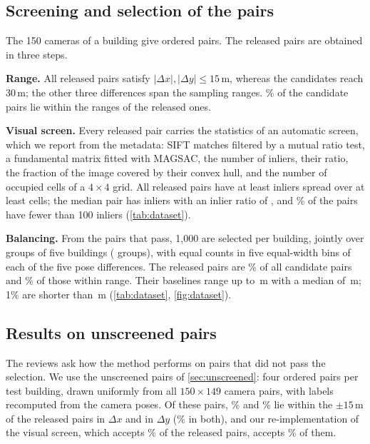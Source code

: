 \subsection{Screening and selection of the pairs}

The 150 cameras of a building give \dsCand{} ordered pairs. The released pairs are obtained in three steps.

\noindent\textbf{Range.} All released pairs satisfy $|\Delta x|,|\Delta y|\le15$\,m, whereas the candidates reach 30\,m; the other three differences span the sampling ranges. \dsInRange\% of the candidate pairs lie within the ranges of the released ones.

\noindent\textbf{Visual screen.} Every released pair carries the statistics of an automatic screen, which we report from the metadata: SIFT matches filtered by a mutual ratio test, a fundamental matrix fitted with MAGSAC, the number of inliers, their ratio, the fraction of the image covered by their convex hull, and the number of occupied cells of a $4{\times}4$ grid. All released pairs have at least \dsMinInl{} inliers spread over at least \dsMinCells{} cells; the median pair has \dsInlMed{} inliers with an inlier ratio of \dsInlRatioMed, and \dsInlLtHundred\% of the pairs have fewer than 100 inliers (\cref{tab:dataset}). 

\noindent\textbf{Balancing.} From the pairs that pass, 1{,}000 are selected per building, jointly over groups of five buildings (\dsGroups{} groups), with equal counts in five equal-width bins of each of the five pose differences. The released pairs are \dsSelFrac\% of all candidate pairs and \dsSelOfInRange\% of those within range. Their baselines range up to \dsDistMax\,m with a median of \dsDistMed\,m; 1\% are shorter than \dsDistPone\,m (\cref{tab:dataset}, \cref{fig:dataset}).

\subsection{Results on unscreened pairs}
\label{sec:unfiltered}

The reviews ask how the method performs on pairs that did not pass the selection. We use the \unN{} unscreened pairs of \cref{sec:unscreened}: four ordered pairs per test building, drawn uniformly from all $150{\times}149$ camera pairs, with labels recomputed from the camera poses. Of these pairs, \ufInX\% and \ufInY\% lie within the $\pm15$\,m of the released pairs in $\Delta x$ and in $\Delta y$ (\unInside\% in both), and our re-implementation of the visual screen, which accepts \ufProxyPass\% of the released pairs, accepts \unScreenPass\% of them.

